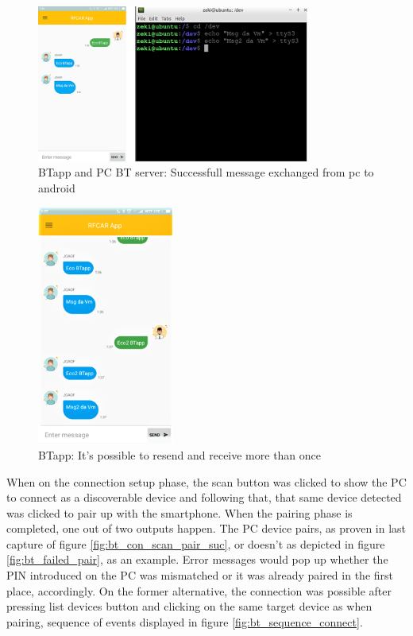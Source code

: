 %
\begin{figure}[!hbt]
\centering
\includegraphics[width=0.8\textwidth]{img/bt_sendPC_recAPP.png}
\caption{\label{fig:bt_sendPC_recAPP}BTapp and PC BT server: Successfull message exchanged from pc to android}
\end{figure}
%
\begin{figure}[!hbt]
\centering
\includegraphics[width=0.4\textwidth]{img/bt_resending_rereceiving.png}
\caption{\label{fig:bt_resending_rereceiving}BTapp: It's possible to resend and receive more than once}
\end{figure}
%
When on the connection setup phase, the scan button was clicked to show the PC to connect as a discoverable device and following that, that same device detected was clicked to pair up with the smartphone. When the pairing phase is completed, one out of two outputs happen. The PC device pairs, as proven in last capture of figure \ref{fig:bt_con_scan_pair_suc}, or doesn't as depicted in figure \ref{fig:bt_failed_pair}, as an example. Error messages would pop up whether the PIN introduced on the PC was mismatched or it was already paired in the first place, accordingly. On the former alternative, the connection was possible after pressing list devices button and clicking on the same target device as when pairing, sequence of events displayed in figure \ref{fig:bt_sequence_connect}.

